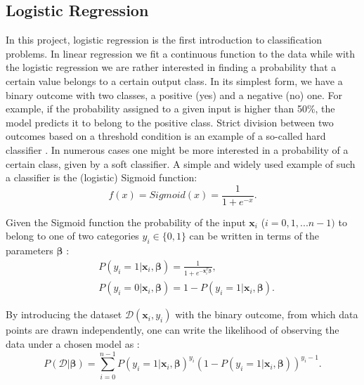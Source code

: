 \documentclass{emulateapj}
\begin{document}
\subsection{Logistic Regression}\label{subsec: logistic regression}

In this project, logistic regression is the first introduction to classification problems. In linear regression we fit a continuous function to the data while with the logistic regression we are rather interested in finding a probability that a certain value belongs to a certain output class. In its simplest form, we have a binary outcome with two classes, a positive (yes) and a negative (no) one. For example, if the probability assigned to a given input is higher than 50\%, the model predicts it to belong to the positive class. Strict division between two outcomes based on a threshold condition is an example of a so-called hard classifier \cite{high bias}. In numerous cases one might be more interested in a probability of a certain class, given by a soft classifier. A simple and widely used example of such a classifier is the (logistic) Sigmoid function:
\begin{equation}\label{eq: sigmoid}
    f(x) = Sigmoid(x)=\frac{1}{1+e^{-x}}.
\end{equation}

Given the Sigmoid function the probability of the input $\textbf{x}_i$ ($i=0,1,...n-1)$ to belong to one of two categories $y_i\in\{0,1\}$ can be written in terms of the parameters $\boldsymbol{\beta}$ \cite{high bias}:
\begin{equation}
\begin{split}
    &P(y_i=1|\textbf{x}_i,\boldsymbol{\beta})=\frac{1}{1+e^{-\textbf{x}_i^T\boldsymbol{\beta}}},\\
    &P(y_i=0|\textbf{x}_i,\boldsymbol{\beta})=1-P(y_i=1|\textbf{x}_i,\boldsymbol{\beta}).
\end{split}
\end{equation}

By introducing the dataset $\mathcal{D}(\textbf{x}_i, y_i)$ with the binary outcome, from which data points are drawn independently, one can write the likelihood of observing the data under a chosen model as \cite{high bias}:
\begin{equation}
P(\mathcal{D}|\boldsymbol{\beta})=\sum_{i=0}^{n-1} P(y_i=1|\textbf{x}_i,\boldsymbol{\beta})^{y_i}(1-P(y_i=1|\textbf{x}_i,\boldsymbol{\beta}))^{y_i-1}.
\end{equation}
\end{document}
